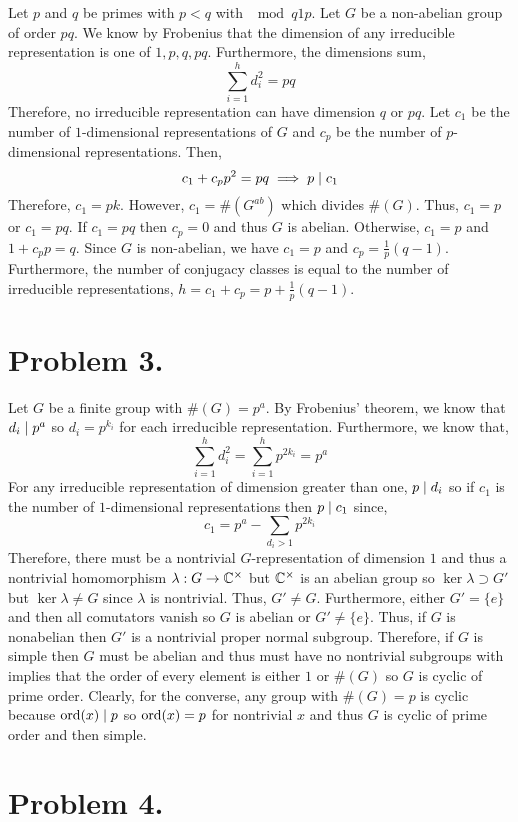 \documentclass[12pt]{extarticle}
\begin{document}
Let $p$ and $q$ be primes with $p < q$ with $\mod{q}{1}{p}$. Let $G$ be a non-abelian group of order $pq$. We know by Frobenius that the dimension of any irreducible representation is one of $1, p, q, pq$. Furthermore, the dimensions sum,
\[ \sum_{i = 1}^h d_i^2 = pq \]
Therefore, no irreducible representation can have dimension $q$ or $pq$. Let $c_1$ be the number of $1$-dimensional representations of $G$ and $c_p$ be the number of $p$-dimensional representations. Then,
\[ c_1 + c_p p^2 = pq \implies p \mid c_1\]
Therefore, $c_1 = pk$. However, $c_1 = \#(G^{ab})$ which divides $\#(G)$. Thus, $c_1 = p$ or $c_1 = pq$. If $c_1 = pq$ then $c_p = 0$ and thus $G$ is abelian. Otherwise, $c_1 = p$ and $1 + c_p p = q$. Since $G$ is non-abelian, we have $c_1 = p$ and $c_p = \frac{1}{p}(q - 1)$. Furthermore, the number of conjugacy classes is equal to the number of irreducible representations, $h = c_1 + c_p = p + \frac{1}{p} (q - 1)$. 

\section*{Problem 3.}

Let $G$ be a finite group with $\#(G) = p^a$. By Frobenius' theorem, we know that $d_i \mid p^a$ so $d_i = p^{k_i}$ for each irreducible representation. Furthermore, we know that,
\[ \sum_{i = 1}^h d_i^2 = \sum_{i = 1}^h p^{2 k_i} = p^a \]
For any irreducible representation of dimension greater than one, $p \mid d_i$ so if $c_1$ is the number of $1$-dimensional representations then $p \mid c_1$ since, 
\[c_1 = p^a - \sum_{d_i > 1} p^{2 k_i}\]
Therefore, there must be a nontrivial $G$-representation of dimension $1$ and thus a nontrivial homomorphism $\lambda : G \to \mathbb{C}^\times$ but $\mathbb{C}^\times$ is an abelian group so $\ker{\lambda} \supset G'$ but $\ker{\lambda} \neq G$ since $\lambda$ is nontrivial. Thus, $G' \neq G$. Furthermore, either $G' = \{e\}$ and then all comutators vanish so $G$ is abelian or $G' \neq \{e\}$. Thus, if $G$ is nonabelian then $G'$ is a nontrivial proper normal subgroup. Therefore, if $G$ is simple then $G$ must be abelian and thus must have no nontrivial subgroups with implies that the order of every element is either $1$ or $\#(G)$ so $G$ is cyclic of prime order. Clearly, for the converse, any group with $\#(G) = p$ is cyclic because $\mathrm{ord}\! \left(x \right) \mid p$ so $\mathrm{ord}\! \left(x \right) = p$ for nontrivial $x$ and thus $G$ is cyclic of prime order and then simple.    

\section*{Problem 4.}
\end{document}

